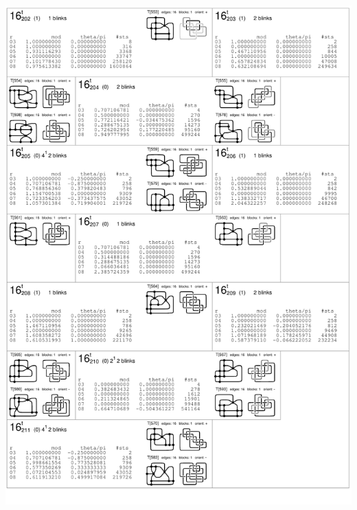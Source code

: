 \begin{center}
 \includegraphics[height=23.5cm]{E.figsbw2/con3catalog035_bw.pdf} \eject

\end{center}
